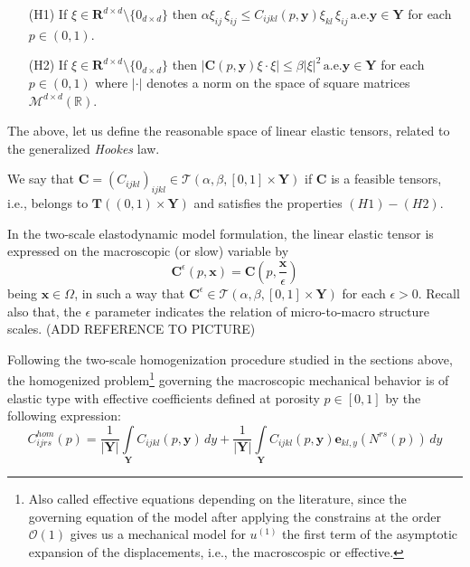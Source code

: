 \begin{enumerate}
    \item[(H1)] If $\xi \in \mathbf{R}^{d\times d} \setminus \{0_{d \times d}\}$ then $\alpha \xi_{ij} \, \xi_{ij} \leq C_{ijkl}(p,\mathbf{y})  \xi_{kl}\,\xi_{ij}\, \text{a.e.} \mathbf{y} \in \mathbf{Y}$ for each $p \in (0,1)$.
    \item[(H2)] If $\xi \in \mathbf{R}^{d\times d} \setminus \{0_{d \times d}\}$ then $\vert \mathbf{C}(p,\mathbf{y}) \xi\cdot \xi \vert \leq \beta \vert \xi \vert^2 \, \text{a.e.}\mathbf{y} \in \mathbf{Y}$ for each $p \in (0,1)$ where $\vert \cdot \vert$ denotes a norm on the space of square matrices $\mathcal{M}^{d\times d}(\mathbb{R})$.
\end{enumerate}
The above, let us define the reasonable space of linear elastic tensors, related to the generalized \textit{Hookes} law.
\begin{defn}
We say that $\mathbf{C} = (C_{ijkl})_{ijkl} \in \mathcal{T}(\alpha, \beta, [0,1]\times \mathbf{Y})$
if $\mathbf{C}$ is a feasible tensors, i.e., belongs to $\mathbf{T}((0,1)\times \mathbf{Y})$ and satisfies the properties $(H1)-(H2)$.
\end{defn}
\begin{rem}
In the two-scale elastodynamic model formulation, the linear elastic tensor is expressed on the macroscopic (or slow) variable by
\begin{equation*}
    \mathbf{C}^{\epsilon}(p,\mathbf{x}) =\mathbf{C}(p,\frac{\mathbf{x}}{\epsilon})
\end{equation*} being $\mathbf{x}\in \Omega$, in such a way that $\mathbf{C}^{\epsilon} \in \mathcal{T}(\alpha, \beta, [0,1]\times \mathbf{Y})$ for each $\epsilon >0$. Recall also that, the $\epsilon$ parameter indicates the relation of micro-to-macro structure scales. (ADD REFERENCE TO PICTURE)
\end{rem}
Following the two-scale homogenization procedure studied in the sections above, the homogenized problem\footnote{Also called effective equations depending on the literature, since the governing equation of the model after applying the constrains at the order $\mathcal{O}(1)$ gives us a mechanical model for $u^{(1)}$ the first term of the asymptotic expansion of the displacements, i.e., the macroscospic or effective.} governing the macroscopic mechanical behavior is of elastic type with effective coefficients defined at porosity $p \in [0,1]$ by the following expression:
\begin{equation}
    \label{eq:homogenized-coeff}
    C^{hom}_{ijrs}(p) = \frac{1}{\vert \mathbf{Y}\vert} \int\limits_{\mathbf{Y}} C_{ijkl}(p,\mathbf{y}) \, dy + \frac{1}{\vert \mathbf{Y}\vert} \int\limits_{\mathbf{Y}} C_{ijkl}(p,\mathbf{y}) \mathbf{e}_{kl,y}( N^{rs}(p))\,dy
\end{equation}
